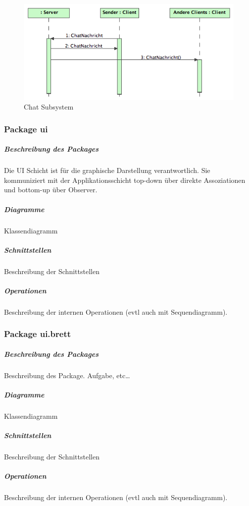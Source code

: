 \documentclass[a4paper,12pt,halfparskip,DIV14]{scrartcl}
\begin{document}
\begin{figure}
	[htp] \centering 
	\includegraphics[width=1\textwidth]{dienste_chat.png} \caption{Chat Subsystem}\label{fig:dienste_chat.png} 
\end{figure}

\newpage
\subsubsection{Package ui} %
\label{ssub:package_ui}
\subparagraph{Beschreibung des Packages} %
\label{ssub:beschreibung_des_packages}
Die UI Schicht ist für die graphische Darstellung verantwortlich. Sie kommuniziert mit der Applikationsschicht top-down über direkte Assoziationen und bottom-up über Observer.
\subparagraph{Diagramme} %
\label{ssub:diagramme}
Klassendiagramm
\subparagraph{Schnittstellen} %
\label{ssub:schnittstellen}
Beschreibung der Schnittstellen
\subparagraph{Operationen} %
\label{ssub:operationen}
Beschreibung der internen Operationen (evtl auch mit Sequendiagramm).

\newpage
\subsubsection{Package ui.brett} %
\label{ssub:package_ui_brett}
\subparagraph{Beschreibung des Packages} %
\label{ssub:beschreibung_des_packages}
Beschreibung des Package. Aufgabe, etc…
\subparagraph{Diagramme} %
\label{ssub:diagramme}
Klassendiagramm
\subparagraph{Schnittstellen} %
\label{ssub:schnittstellen}
Beschreibung der Schnittstellen
\subparagraph{Operationen} %
\label{ssub:operationen}
Beschreibung der internen Operationen (evtl auch mit Sequendiagramm).
\end{document}
